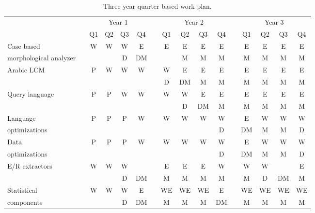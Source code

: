 \documentclass[12pt]{article}
\begin{document}
{%
\begin{table}[bt]
\centering
\caption{Three year quarter based work plan.}
\small
\begin{tabular}{lp{.1cm}ccccp{.1cm}ccccp{.1cm}cccc} \\
& & \multicolumn{4}{c}{Year 1} & & \multicolumn{4}{c}{Year 2} & & \multicolumn{4}{c}{Year 3} \\ \cline{3-6} \cline{8-11} \cline{13-16} %
& & Q1 & Q2 & Q3 & Q4 & & Q1 & Q2 & Q3 & Q4 & & Q1 & Q2 & Q3 & Q4 \\ \bottomrule

Case based & & 
W & W & W & E & & E & E & E & E & & E & E & E & E \\ 
morphological analyzer & & 
 &  & D & DM & &   & M & M & M & & M & M & M & M \\  \hline

\multirow{2}{*}{Arabic LCM} & & 
P & W & W & W & & W & E & E & E & & E & E & E & E \\ 
& & 
 &  &  &  & & D & DM & M & M & & M & M & M & M \\ \hline

\multirow{2}{*}{Query language} & & 
P & P & W & W & & W & W & E & E & & E & E & E & E \\ 
& & 
  &  &  &  & &  & D & DM & M & & M & M & M & M \\ \hline

Language & & 
P & P & P & W & & W & W & W & W & & E & W & W & W \\ 
optimizations & & 
 &  &  &  & &  &  &  & D & & DM & M & M & D \\ \hline

Data  & & 
P & P & P & W & & W & W & W & W & & E & W & W & W \\ 
optimizations & & 
 &  &  &  & &  &  &  & D & & DM & M & M & D \\ \hline

\multirow{2}{*}{E/R extractors} & & 
W & W & W &  & & E & E & E & W & & W & W &  & E \\ 
& & 
 &  & D & DM & & M & M & M & M & & M & D & DM & M \\ \hline

Statistical & & 
W & W & W & E & & WE & WE & WE & E & & WE & WE & WE & WE \\ 
components & & 
 &  & D & DM & & M & M & M & DM & & M & M & M & M \\ \hline


\end{tabular}
\end{table}}
\end{document}
